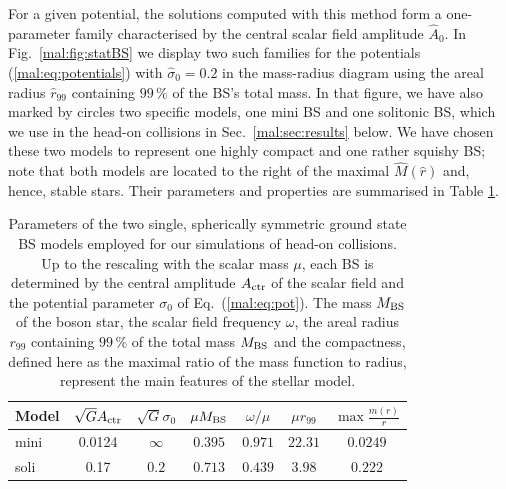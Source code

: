 For a given potential, the solutions computed with this method
form a one-parameter family characterised
by the central scalar field amplitude $\hat{A}_0$. In
Fig.~\ref{mal:fig:statBS} we display two such families for the
potentials (\ref{mal:eq:potentials}) with $\hat{\sigma}_0=0.2$ in the
mass-radius diagram using the areal radius $\hat{r}_{99}$ containing
$99\,\%$ of the BS's total mass. In that figure, we have also marked
by circles two specific models, one mini BS and one solitonic BS,
which we use in the head-on collisions in Sec.~\ref{mal:sec:results} below.
We have chosen these two models to represent one highly compact and
one rather squishy BS; note that both models are located
to the right of the maximal $\hat{M}(\hat{r})$ and, hence, stable stars.
Their parameters and properties are summarised in Table
\ref{mal:tab:models}.
%
\begin{table}
    \centering
    \begin{tabular}{l|cccccc}
    \hline
    Model & $\sqrt{G}A_{\rm ctr}$ & $\sqrt{G}\sigma_0$ & $\mu M_{\rm BS}$ & $\omega/\mu$ & $\mu r_{99}$ & $\max\frac{m(r)}{r}$  \\
    \hline
    mini & 0.0124 & $\infty$ & $0.395$ & $0.971$ & $22.31$ & $0.0249$ \\
    soli & 0.17 & $0.2$ & $0.713$ & $0.439$ & $3.98$ & $0.222$ \\
    \hline
    \end{tabular}
    \caption{Parameters of the two single, spherically symmetric
    ground state BS models employed for our simulations of
    head-on collisions. Up to the rescaling with the scalar mass
    $\mu$, each BS is determined by the central amplitude
    $A_{\rm ctr}$ of the scalar field and the potential parameter
    $\sigma_0$ of Eq.~(\ref{mal:eq:pot}). The mass $M_{\rm BS}$ of the boson star,
    the scalar field frequency $\omega$, the areal radius $r_{99}$ containing
    $99\,\%$ of the total mass $M_{\rm BS}$ and the compactness, defined here
    as the maximal ratio of the mass function to radius, represent
    the main features of the stellar model.}
    \label{mal:tab:models}
\end{table}
%

